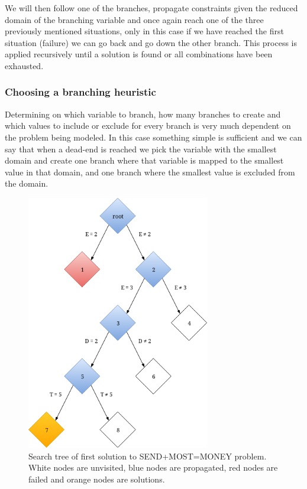 We will then follow one of the branches, propagate constraints given the reduced domain
of the branching variable and once again reach one of the three previously mentioned
situations, only in this case if we have reached the first situation (failure) we can go
back and go down the other branch. This process is applied recursively until a solution
is found or all combinations have been exhausted.

\subsubsection{Choosing a branching heuristic}

Determining on which variable to branch, how many branches to create and which values to
include or exclude for every branch is very much dependent on the problem being modeled.
In this case something simple is sufficient and we can say that when a dead-end is reached
we pick the variable with the smallest domain and create one branch where that variable
is mapped to the smallest value in that domain, and one branch where the smallest value
is excluded from the domain.

\begin{figure}[h]
	\centering
	\includegraphics[width=8cm]{background/constraint-programming/figures/constraint_first_solution}
	\caption{Search tree of first solution to SEND+MOST=MONEY problem.
	White nodes are unvisited, blue nodes are propagated, red nodes are failed and orange nodes are solutions.}
	\label{fig:first_solution}
\end{figure}


